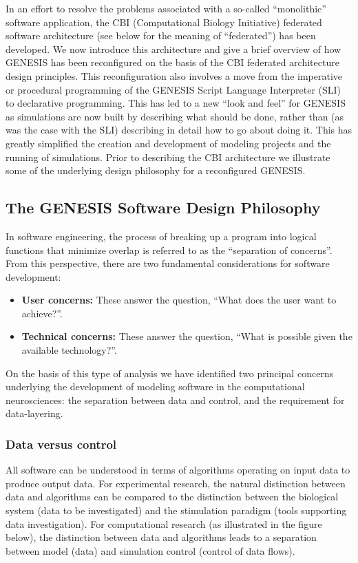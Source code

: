 \documentclass[12pt]{article}
\begin{document}
In an effort to resolve the problems associated with a so-called ``monolithic'' software application, the CBI (Computational Biology Initiative) federated software architecture (see below for the meaning of ``federated'') has been developed. We now introduce this architecture and give a brief overview of how GENESIS has been reconfigured on the basis of the CBI federated architecture design principles. This reconfiguration also involves a move from the imperative or procedural programming of the GENESIS Script Language Interpreter (SLI) to declarative programming. This has led to a new ``look and feel'' for GENESIS as simulations are now built by describing what should be done, rather than (as was the case with the SLI) describing in detail how to go about doing it. This has greatly simplified the creation and development of modeling projects and the running of simulations. Prior to describing the CBI architecture we illustrate some of the underlying design philosophy for a reconfigured GENESIS.

\subsection*{The GENESIS Software Design Philosophy}
In software engineering, the process of breaking up a program into logical functions that minimize overlap is referred to as the ``separation of concerns''.  From this perspective, there are two fundamental considerations for software development:

\begin{itemize}
\item {\bf User concerns:} These answer the question, ``What does the user want to achieve?''.
\item {\bf Technical concerns:} These answer the question, ``What is possible given the available technology?''.
\end{itemize}

On the basis of this type of analysis we have identified two principal concerns underlying the development of modeling software in the computational neurosciences: the separation between data and control, and the requirement for data-layering.

\subsubsection*{Data versus control}
\label{sec:data-vs-control}
All software can be understood in terms of algorithms operating on input data to produce output data. For experimental research, the natural distinction between data and algorithms can be compared to the distinction between the biological system (data to be investigated) and the stimulation paradigm (tools supporting data investigation). For computational research (as illustrated in the figure below), the distinction between data and algorithms leads to a separation between model (data) and simulation control (control of data flows). 
\end{document}
